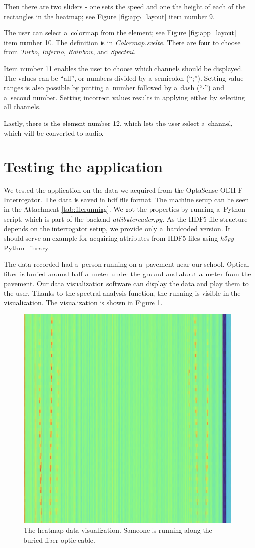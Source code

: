 Then there are two sliders - one sets the speed and one the height of each of the rectangles in the heatmap; see Figure \ref{fig:app_layout} item number 9.

The user can select a~colormap from the element; see Figure \ref{fig:app_layout} item number 10. The definition is in \textit{Colormap.svelte}. There are four to choose from \textit{Turbo}, \textit{Inferno}, \textit{Rainbow}, and \textit{Spectral}.

Item number 11 enables the user to choose which channels should be displayed. The values can be ``all'', or numbers divided by a~semicolon (``;''). Setting value ranges is also possible by putting a~number followed by a~dash (``-'') and a~second number. Setting incorrect values results in applying either by selecting all channels.

Lastly, there is the element number 12, which lets the user select a~channel, which will be converted to audio.

\section{Testing the application}

We tested the application on the data we acquired from the OptaSense ODH-F Interrogator. The data is saved in \ac{hdf} file format. The machine setup can be seen in the Attachment \ref{tab:filerunning}. We got the properties by running a~Python script, which is part of the backend \textit{attibutereader.py}. As the HDF5 file structure depends on the interrogator setup, we provide only a~hardcoded version. It should serve an example for acquiring attributes from HDF5 files using \textit{h5py} Python library.

The data recorded had a~person running on a~pavement near our school. Optical fiber is buried around half a~meter under the ground and about a~meter from the pavement. Our data visualization software can display the data and play them to the user. Thanks to the spectral analysis function, the running is visible in the visualization. The visualization is shown in Figure \ref{fig:dataviz}.

\begin{figure}
    \centering
    \includegraphics[width=0.7\linewidth]{obrazky/data_viz.png}
    \caption{The heatmap data visualization. Someone is running along the buried fiber optic cable.}
    \label{fig:dataviz}
\end{figure}